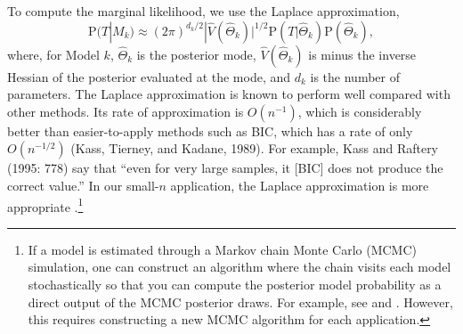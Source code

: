 \documentclass[11pt,titlepage]{article}
\renewcommand{\P}{\text{P}}
\begin{document}
To compute the marginal likelihood, we use the Laplace approximation,
\begin{equation}
  \P(T|M_k) \approx (2 \pi)^{{d_k}/2}|\widehat V(\hat\Theta_k)|^{1/2}
  \P(T|\hat{\Theta}_k) \P(\hat{\Theta}_k),
\end{equation}
where, for Model $k$, $\hat{\Theta}_k$ is the posterior mode, $\hat
V(\hat\Theta_k)$ is minus the inverse Hessian of the posterior evaluated
at the mode, and $d_k$ is the number of parameters.  The Laplace
approximation is known to perform well compared with other methods.
Its rate of approximation is $O(n^{-1})$, which is considerably better
than easier-to-apply methods such as BIC, which has a rate of only
$O(n^{-1/2})$ (Kass, Tierney, and Kadane,
1989\nocite{kass:tier:kada:89}).  For example, Kass and Raftery (1995:
778) say that ``even for very large samples, it [BIC] does not produce
the correct value.''  In our small-$n$ application, the Laplace
approximation is more appropriate
\citep{raft:96,lewi:raft:97,dici:kass:raft:wass:97}.\footnote{If a
  model is estimated through a Markov chain Monte Carlo (MCMC)
  simulation, one can construct an algorithm where the chain visits
  each model stochastically so that you can compute the posterior
  model probability as a direct output of the MCMC posterior draws.
  For example, see \citet{carl:chib:95} and \citet{geor:mccu:93}.
  However, this requires constructing a new MCMC algorithm for each
  application.}

\singlespacing

% 

\end{document}
